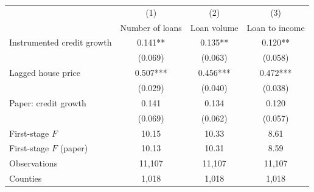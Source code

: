 \begin{tabular}{lccc}
\toprule
 & (1) & (2) & (3) \\
 & Number of loans & Loan volume & Loan to income \\
\midrule
Instrumented credit growth & 0.141** & 0.135** & 0.120** \\
 & (0.069) & (0.063) & (0.058) \\
Lagged house price & 0.507*** & 0.456*** & 0.472*** \\
 & (0.029) & (0.040) & (0.038) \\
\midrule
Paper: credit growth & 0.141 & 0.134 & 0.120 \\
 & (0.069) & (0.062) & (0.057) \\
\midrule
First-stage $F$ & 10.15 & 10.33 & 8.61 \\
First-stage $F$ (paper) & 10.13 & 10.31 & 8.59 \\
Observations & 11,107 & 11,107 & 11,107 \\
Counties & 1,018 & 1,018 & 1,018 \\
\bottomrule
\end{tabular}